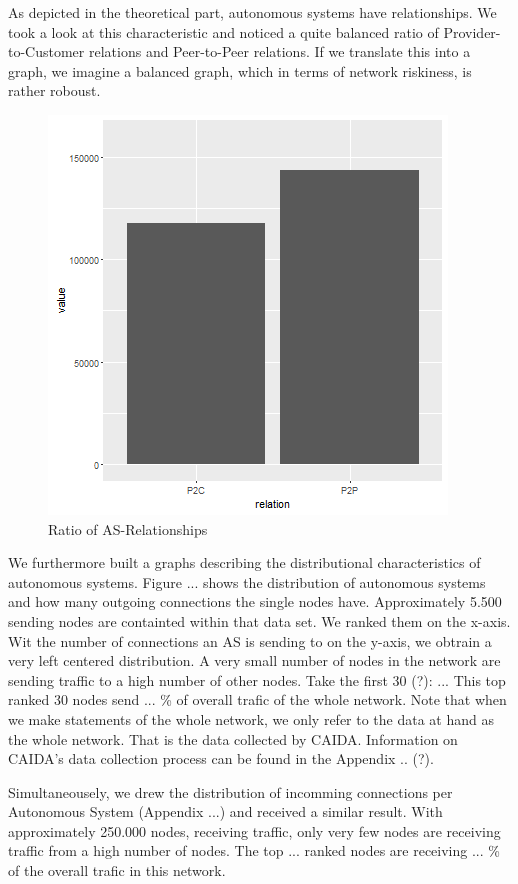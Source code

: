 \documentclass[conference]{IEEEtran}
\begin{document}
As depicted in the theoretical part, autonomous systems have relationships. We took a look at this characteristic and noticed a quite balanced ratio of Provider-to-Customer relations and Peer-to-Peer relations. If we translate this into a graph, we imagine a balanced graph, which in terms of network riskiness, is rather roboust. 

\begin{figure}[htbp]
\centerline{\includegraphics[scale=0.4]{Graphics/relationspeerandprovider.png}}
\caption{Ratio of AS-Relationships }
\label{fig}
\end{figure}


We furthermore built a graphs describing the distributional characteristics of autonomous systems. Figure ... shows the distribution of autonomous systems and how many outgoing connections the single nodes have. Approximately 5.500 sending nodes are containted within that data set. We ranked them on the x-axis. Wit the number of connections an AS is sending to on the y-axis, we obtrain a very left centered distribution. A very small number of nodes in the network are sending traffic to a high number of other nodes. Take the first 30 (?): ... This top ranked 30 nodes send ... \% of overall trafic of the whole network. Note that when we make statements of the whole network, we only refer to the data at hand as the whole network. That is the data collected by CAIDA. Information on CAIDA's data collection process can be found in the Appendix .. (?). 

Simultaneousely, we drew the distribution of incomming connections per Autonomous System (Appendix ...) and received a similar result. With approximately 250.000 nodes, receiving traffic, only very few nodes are receiving traffic from a high number of nodes. The top ... ranked nodes are receiving ... \% of the overall trafic in this network. 
\end{document}
